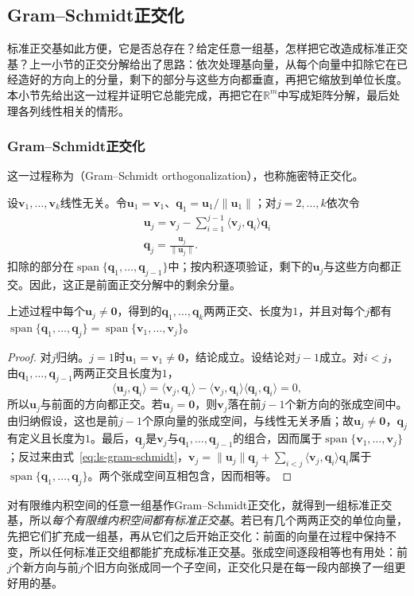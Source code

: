 \subsection{Gram--Schmidt正交化}
\label{sec:ls-orthonormal-basis-construction}

标准正交基如此方便，它是否总存在？给定任意一组基，怎样把它改造成标准正交基？上一小节的正交分解给出了思路：依次处理基向量，从每个向量中扣除它在已经造好的方向上的分量，剩下的部分与这些方向都垂直，再把它缩放到单位长度。本小节先给出这一过程并证明它总能完成，再把它在$\mathbb R^m$中写成矩阵分解，最后处理各列线性相关的情形。

\subsubsection{Gram--Schmidt正交化}

这一过程称为（Gram--Schmidt orthogonalization），也称施密特正交化。

设$\bm v_1,\ldots,\bm v_k$线性无关。令$\bm u_1=\bm v_1$、$\bm q_1=\bm u_1/\lVert\bm u_1\rVert$；对$j=2,\ldots,k$依次令
\begin{equation}
\begin{gathered}
\bm u_j=\bm v_j-\sum_{i=1}^{j-1}\langle\bm v_j,\bm q_i\rangle\bm q_i\\
\bm q_j=\frac{\bm u_j}{\lVert\bm u_j\rVert}.
\end{gathered}
\label{eq:ls-gram-schmidt}
\end{equation}
扣除的部分在$\operatorname{span}\{\bm q_1,\ldots,\bm q_{j-1}\}$中；按内积逐项验证，剩下的$\bm u_j$与这些方向都正交。因此，这正是前面正交分解中的剩余分量。
\begin{theorem}
\label{thm:ls-gram-schmidt}
上述过程中每个$\bm u_j\neq\bm0$，得到的$\bm q_1,\ldots,\bm q_k$两两正交、长度为$1$，并且对每个$j$都有$\operatorname{span}\{\bm q_1,\ldots,\bm q_j\}=\operatorname{span}\{\bm v_1,\ldots,\bm v_j\}$。
\end{theorem}
\begin{proof}
对$j$归纳。$j=1$时$\bm u_1=\bm v_1\neq\bm0$，结论成立。设结论对$j-1$成立。对$i<j$，由$\bm q_1,\ldots,\bm q_{j-1}$两两正交且长度为$1$，
\[
 \langle\bm u_j,\bm q_i\rangle=\langle\bm v_j,\bm q_i\rangle-\langle\bm v_j,\bm q_i\rangle\langle\bm q_i,\bm q_i\rangle=0,
\]
所以$\bm u_j$与前面的方向都正交。若$\bm u_j=\bm0$，则$\bm v_j$落在前$j-1$个新方向的张成空间中。由归纳假设，这也是前$j-1$个原向量的张成空间，与线性无关矛盾；故$\bm u_j\neq\bm0$，$\bm q_j$有定义且长度为$1$。最后，$\bm q_j$是$\bm v_j$与$\bm q_1,\ldots,\bm q_{j-1}$的组合，因而属于$\operatorname{span}\{\bm v_1,\ldots,\bm v_j\}$；反过来由式~\eqref{eq:ls-gram-schmidt}，$\bm v_j=\lVert\bm u_j\rVert\bm q_j+\sum_{i<j}\langle\bm v_j,\bm q_i\rangle\bm q_i$属于$\operatorname{span}\{\bm q_1,\ldots,\bm q_j\}$。两个张成空间互相包含，因而相等。
\end{proof}
对有限维内积空间的任意一组基作Gram--Schmidt正交化，就得到一组标准正交基，所以\emph{每个有限维内积空间都有标准正交基}。若已有几个两两正交的单位向量，先把它们扩充成一组基，再从它们之后开始正交化：前面的向量在过程中保持不变，所以任何标准正交组都能扩充成标准正交基。张成空间逐段相等也有用处：前$j$个新方向与前$j$个旧方向张成同一个子空间，正交化只是在每一段内部换了一组更好用的基。

